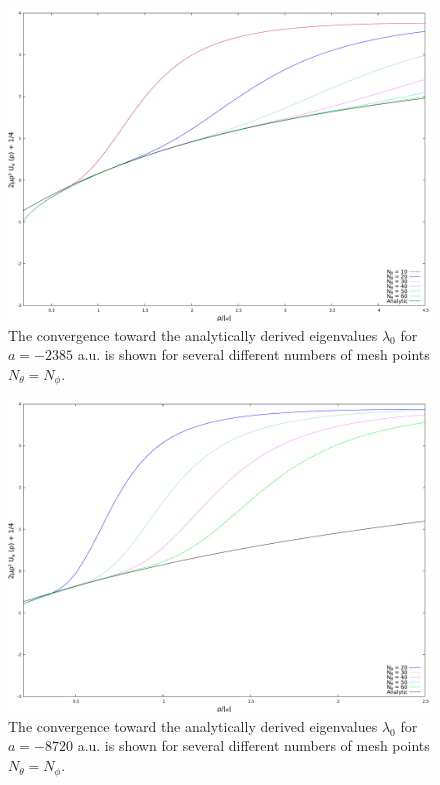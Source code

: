 \begin{figure}
	\includegraphics[width=\linewidth]{sn2385.pdf}
	\caption{The convergence toward the analytically derived eigenvalues $\lambda_0$ for $a=-2385$ a.u. is shown for several different numbers of mesh points $N_{\theta}=N_{\phi}$.}
	\label{fig:res_6}
\end{figure}

\begin{figure}
	\includegraphics[width=\linewidth]{sn8720.pdf}
	\caption{The convergence toward the analytically derived eigenvalues $\lambda_0$ for $a=-8720$ a.u. is shown for several different numbers of mesh points $N_{\theta}=N_{\phi}$.}
	\label{fig:res_7}
\end{figure}

